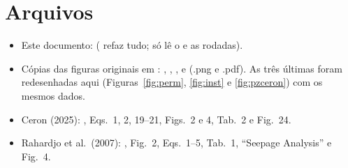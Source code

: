 \documentclass[11pt,a4paper]{article}
\begin{document}
\appendix
\section{Arquivos}\label{sec:arquivos}
\begin{itemize}
  \item Este documento:  ( refaz tudo;
     só lê o  e as rodadas).
  \item Cópias das figuras originais em : , ,
    ,  e  (.png e .pdf). As três últimas foram
    redesenhadas aqui (Figuras~\ref{fig:perm}, \ref{fig:inst} e \ref{fig:pzceron}) com os mesmos dados.
  \item Ceron (2025): , Eqs.~1, 2, 19--21, Figs.~2
    e 4, Tab.~2 e Fig.~24.
  \item Rahardjo et al.\ (2007): , Fig.~2, Eqs.~1--5,
    Tab.~1, ``Seepage Analysis'' e Fig.~4.
\end{itemize}
\end{document}
